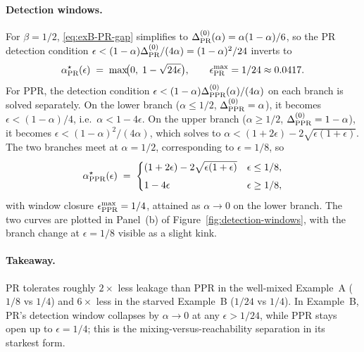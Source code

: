 \documentclass{article}
\theoremstyle{plain}
\theoremstyle{definition}
\newcommand{\arXivtag}[1][]{#1}
\begin{document}
\paragraph{Detection windows.} For $\beta = 1/2$, \eqref{eq:exB-PR-gap} simplifies to $\Delta^{(0)}_{\textnormal{PR}}(\alpha) = \alpha(1-\alpha)/6$, so the PR detection condition $\epsilon < (1-\alpha)\Delta^{(0)}_{\textnormal{PR}}/(4\alpha) = (1-\alpha)^2/24$ inverts to
	\begin{equation}\label{eq:exB-PR-star}
		\alpha^\star_{\textnormal{PR}}(\epsilon) \;=\; \max\!\bigl(0,\; 1 - \sqrt{24\epsilon}\bigr), \qquad \epsilon^{\max}_{\textnormal{PR}} = 1/24 \approx 0.0417.
	\end{equation}
	For PPR, the detection condition $\epsilon < (1-\alpha)\Delta^{(0)}_{\textnormal{PPR}}(\alpha)/(4\alpha)$ on each branch is solved separately. On the lower branch ($\alpha \leq 1/2$, $\Delta^{(0)}_{\textnormal{PPR}} = \alpha$), it becomes $\epsilon < (1-\alpha)/4$, i.e.\ $\alpha < 1-4\epsilon$. On the upper branch ($\alpha \geq 1/2$, $\Delta^{(0)}_{\textnormal{PPR}} = 1-\alpha$), it becomes $\epsilon < (1-\alpha)^2/(4\alpha)$, which solves to $\alpha < (1+2\epsilon) - 2\sqrt{\epsilon(1+\epsilon)}$. The two branches meet at $\alpha = 1/2$, corresponding to $\epsilon = 1/8$, so
	\begin{equation}\label{eq:exB-PPR-star}
		\alpha^\star_{\textnormal{PPR}}(\epsilon) \;=\; \begin{cases} (1+2\epsilon) - 2\sqrt{\epsilon(1+\epsilon)} & \epsilon \leq 1/8,\\[4pt] 1-4\epsilon & \epsilon \geq 1/8, \end{cases}
	\end{equation}
	with window closure $\epsilon^{\max}_{\textnormal{PPR}} = 1/4$, attained as $\alpha \to 0$ on the lower branch. The two curves are plotted in Panel~\arXivtag[(b)] of Figure~\ref{fig:detection-windows}, with the branch change at $\epsilon = 1/8$ visible as a slight kink.

\paragraph{Takeaway.} PR tolerates roughly $2\times$ less leakage than PPR in the well-mixed Example~A ($1/8$ vs $1/4$) and $6\times$ less in the starved Example~B ($1/24$ vs $1/4$). In Example~B, PR's detection window collapses by $\alpha \to 0$ at any $\epsilon > 1/24$, while PPR stays open up to $\epsilon = 1/4$; this is the mixing-versus-reachability separation in its starkest form.
\end{document}
